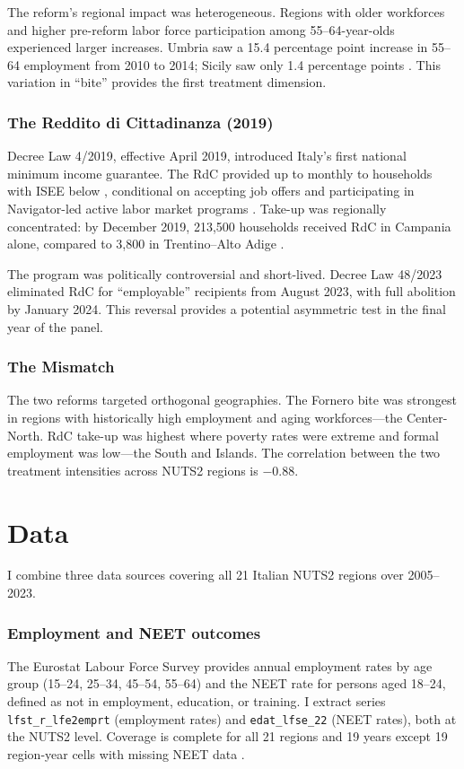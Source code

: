 \documentclass[12pt]{article}
\begin{document}
The reform's regional impact was heterogeneous. Regions with older workforces and higher pre-reform labor force participation among 55--64-year-olds experienced larger increases. Umbria saw a 15.4 percentage point increase in 55--64 employment from 2010 to 2014; Sicily saw only 1.4 percentage points \citep{eurostat2024}. This variation in ``bite'' provides the first treatment dimension.

\subsubsection*{The Reddito di Cittadinanza (2019)} Decree Law 4/2019, effective April 2019, introduced Italy's first national minimum income guarantee. The RdC provided up to  monthly to households with ISEE below , conditional on accepting job offers and participating in Navigator-led active labor market programs \citep{ferrante2023}. Take-up was regionally concentrated: by December 2019, 213,500 households received RdC in Campania alone, compared to 3,800 in Trentino--Alto Adige \citep{inps2019rdc}.

The program was politically controversial and short-lived. Decree Law 48/2023 eliminated RdC for ``employable'' recipients from August 2023, with full abolition by January 2024. This reversal provides a potential asymmetric test in the final year of the panel.

\subsubsection*{The Mismatch} The two reforms targeted orthogonal geographies. The Fornero bite was strongest in regions with historically high employment and aging workforces---the Center-North. RdC take-up was highest where poverty rates were extreme and formal employment was low---the South and Islands. The correlation between the two treatment intensities across NUTS2 regions is $-0.88$.


\section{Data}
\label{sec:data}

I combine three data sources covering all 21 Italian NUTS2 regions over 2005--2023.

\subsubsection*{Employment and NEET outcomes} The Eurostat Labour Force Survey provides annual employment rates by age group (15--24, 25--34, 45--54, 55--64) and the NEET rate for persons aged 18--24, defined as not in employment, education, or training. I extract series \texttt{lfst\_r\_lfe2emprt} (employment rates) and \texttt{edat\_lfse\_22} (NEET rates), both at the NUTS2 level. Coverage is complete for all 21 regions and 19 years except 19 region-year cells with missing NEET data \citep{eurostat2024}.
\end{document}

